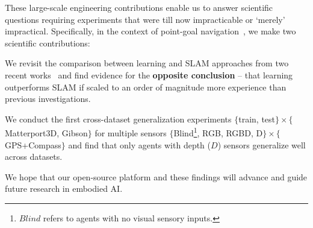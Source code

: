 These large-scale engineering contributions enable us to answer scientific questions requiring experiments that were till now impracticable or `merely' impractical.
Specifically, in the context of point-goal navigation~\cite{Anderson2018-Evaluation}, we 
make two scientific contributions: 
%
\begin{asparaenum}
\item We revisit the comparison between learning and SLAM approaches from two recent works~\cite{mishkin2019benchmarking, kojima2019learn}
and find evidence for the \textbf{opposite conclusion} -- that learning outperforms SLAM if scaled to an order of magnitude more experience than previous investigations.

\item We conduct the first cross-dataset generalization experiments $\{$train, test$\} \times \{$Matterport3D, Gibson$\}$ for multiple sensors $\{$Blind\footnote{$Blind$ refers to agents with no visual sensory inputs.}, RGB, RGBD, D$\} \times \{$GPS+Compass$\}$ and find that only agents with depth ($D$) sensors generalize well across datasets.
\end{asparaenum}

We hope that our open-source platform and these findings will advance and guide 
future research in embodied AI. 
